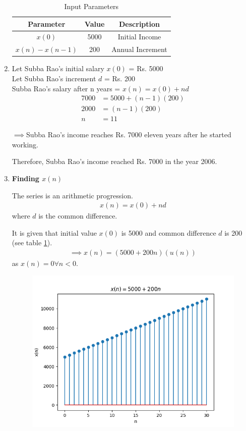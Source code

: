 \documentclass[journal,12pt,twocolumn]{IEEEtran}
\theoremstyle{remark}
\begin{document}
\begin{enumerate}
\begin{table}[h!]
    \centering
    \caption{Input Parameters}
    \label{tab:1}
    \begin{tabular}{ | c | c | c | }
        \hline
        Parameter & Value & Description \\
        \hline
        $x(0)$ & 5000 & Initial Income \\
        $x(n) - x(n - 1)$ & 200 & Annual Increment\\
        \hline
    \end{tabular}
\end{table}
\item
Let Subba Rao's initial salary $x(0)$ = Rs. 5000
\\
Let Subba Rao's increment $d$ = Rs. 200
\\
Subba Rao's salary after n years = $x(n) = x(0) + nd$
\begin{align}
7000 &= 5000 + (n - 1)(200) \\
2000 &= (n - 1)(200) \\
n &= 11
\end{align}

$\implies$Subba Rao's income reaches Rs. 7000 eleven years after he started working.

Therefore, Subba Rao's income reached Rs. 7000 in the year 2006.

\item \textbf{Finding $x(n)$}

The series is an arithmetic progression.
\begin{align}
x(n) = x(0) + nd
\end{align}
where $d$ is the common difference.

It is given that initial value $x(0)$ is 5000 and common difference $d$ is 200 (see table \ref{tab:1}).
\begin{align}
\implies x(n) = (5000 + 200n)(u(n))
\end{align}
as $x(n) = 0 \forall n < 0$.

\begin{figure}[h!]
    \centering
    \includegraphics[width=\columnwidth]{figs/10_5_2_19.png}
\end{figure}


\end{enumerate}
\end{document}
